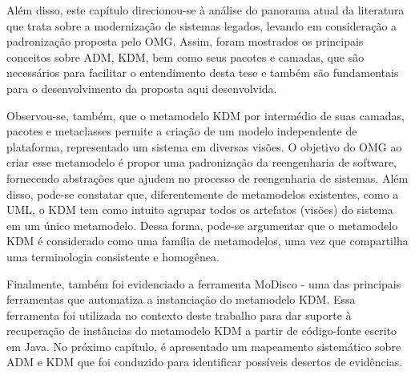 Além disso, este capítulo direcionou-se à análise do panorama atual da literatura que trata sobre a modernização de sistemas legados, levando em consideração a padronização proposta pelo OMG. Assim, foram mostrados os principais conceitos sobre ADM, KDM, bem como seus pacotes e camadas, que são necessários para facilitar o entendimento desta tese e também são fundamentais para o desenvolvimento da proposta aqui desenvolvida.

Observou-se, também, que o metamodelo KDM por intermédio de suas camadas, pacotes e metaclasses permite a criação de um modelo independente de plataforma, representado um sistema em diversas visões. O objetivo do OMG ao criar esse metamodelo é propor uma padronização da reengenharia de software, fornecendo abstrações que ajudem no processo de reengenharia de sistemas. Além disso, pode-se constatar que, diferentemente de metamodelos existentes, como a UML, o KDM tem como intuito agrupar todos os artefatos (visões) do sistema em um único metamodelo. Dessa forma, pode-se argumentar que o metamodelo KDM é considerado como uma família de metamodelos, uma vez que compartilha uma terminologia consistente e homogênea.

Finalmente, também foi evidenciado a ferramenta MoDisco - uma das principais ferramentas que automatiza a instanciação do metamodelo KDM. Essa ferramenta foi utilizada no contexto deste trabalho para dar suporte à recuperação de instâncias do metamodelo KDM a partir de código-fonte escrito em Java. No próximo capítulo, é apresentado um mapeamento sistemático sobre ADM e KDM que foi conduzido para identificar possíveis desertos de evidências.